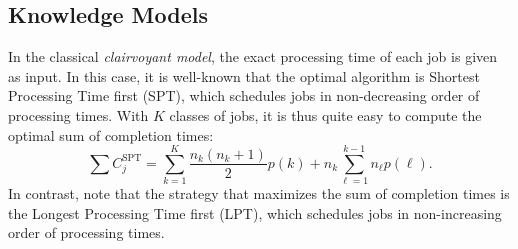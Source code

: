 \documentclass{article}
\begin{document}

\subsection{Knowledge Models}

In the classical \emph{clairvoyant model}, the exact processing time of each job
is given as input.  
In this case, it is well-known that the optimal algorithm is Shortest Processing
Time first (SPT), which schedules jobs in non-decreasing order of processing
times.  
With \(K\) classes of jobs, it is thus quite easy to compute the optimal
sum of completion times:  
\[
    \sum C_j^{\text{SPT}}=
        \sum_{k=1}^{K} \frac{n_k(n_k+1)}{2}p(k)+
        n_k\sum_{\ell=1}^{k-1} n_\ell p(\ell).
\]
In contrast, note that the strategy that maximizes the sum of completion times
is the Longest Processing Time first (LPT), which schedules jobs in
non-increasing order of processing times.






\end{document}
